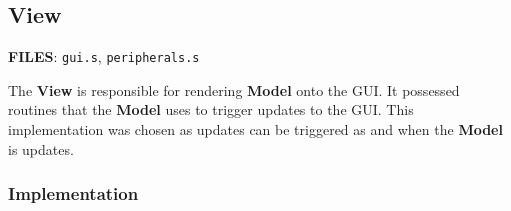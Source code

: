   \subsection{View}

  \quad\textbf{FILES}: \texttt{gui.s}, \texttt{peripherals.s}


  The \textbf{View} is responsible for rendering \textbf{Model} onto the GUI. It possessed routines that
  the \textbf{Model} uses to trigger updates to the GUI. This implementation was chosen as updates can
  be triggered as and when the \textbf{Model} is updates.

    \subsubsection{Implementation}


